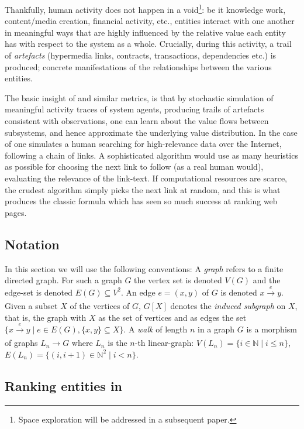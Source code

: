 Thankfully, human activity does not happen in a void\footnote{Space
  exploration will be addressed in a subsequent paper.}: be it
knowledge work, content/media creation, financial activity, etc.,
entities interact with one another in meaningful ways that are highly
influenced by the relative value each entity has with respect to the
system as a whole. Crucially, during this activity, a trail of
\emph{artefacts} (hypermedia links, contracts, transactions,
dependencies etc.) is produced; concrete manifestations
of the relationships between the various entities.

The basic insight of \pagerank{} and similar metrics, is that by
stochastic simulation of meaningful activity traces of system agents,
producing trails of artefacts consistent with observations, one can
learn about the value flows between subsystems, and hence approximate
the underlying value distribution. In the case of \pagerank{} one
simulates a human searching for high-relevance data over the Internet,
following a chain of links. A sophisticated algorithm would use as
many heuristics as possible for choosing the next link to follow (as a
real human would), \eg{} evaluating the relevance of the link-text. If
computational resources are scarce, the crudest algorithm simply picks
the next link at random, and this is what produces the classic
\pagerank{} formula which has seen so much success at ranking web
pages.

\subsection{Notation}

In this section we will use the following conventions: A \emph{graph} refers to
a finite directed graph. For such a graph $G$ the vertex set is denoted $V(G)$
and the edge-set is denoted $E(G) \subseteq V^2$. An edge $e = (x,y)$ of $G$ is
denoted $x \xrightarrow[]{e} y$. Given a subset $X$ of the vertices of $G$,
$G[X]$ denotes the \emph{induced subgraph} on $X$, that is, the graph with $X$
as the set of vertices and as edges the set
$\{ x \xrightarrow[]{e} y \mid e \in E(G), \{x,y\} \subseteq X\}$. A \emph{walk}
of length $n$ in a graph $G$ is a morphism of graphs $L_n \to G$ where $L_n$ is
the $n$-th linear-graph: $V(L_n) = \{i \in \mathbb{N} \mid i \leq n \}$,
$E(L_n) = \{ (i,i+1) \in \mathbb{N}^2 \mid i < n \}$.

\subsection{Ranking entities in \oscoin{}}
\label{s:netgraph}

